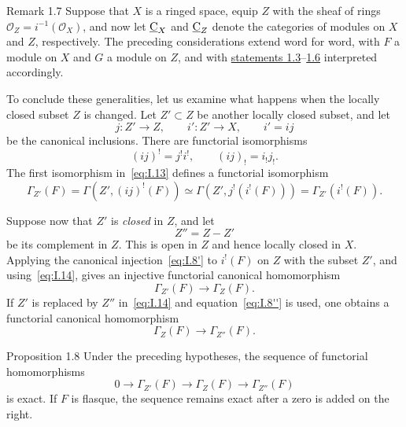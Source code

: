 \begin{sgaremark}{Remark 1.7}
Suppose that $X$ is a ringed space, equip $Z$ with the sheaf of rings
$\mathcal O_Z=i^{-1}(\mathcal O_X)$, and now let $\underline{\mathrm C}_X$ and $\underline{\mathrm C}_Z$
denote the categories of modules on $X$ and $Z$, respectively.  The
preceding considerations extend word for word, with $F$ a module on $X$
and $G$ a module on $Z$, and with \hyperref[I.1.3]{statements 1.3}--\hyperref[I.1.6]{1.6} interpreted
accordingly.
\end{sgaremark}

To conclude these generalities, let us examine what happens when the
locally closed subset $Z$ is changed.  Let $Z'\subset Z$ be another
locally closed subset, and let
\[
  j:Z'\longrightarrow Z,
  \qquad i':Z'\longrightarrow X,
  \qquad i'=ij
\]
be the canonical inclusions.  There are functorial
isomorphisms
\begin{equation}
  (ij)^!=j^!i^!,
  \qquad
  (ij)_!=i_!j_!.
  \tag{13}\label{eq:I.13}
\end{equation}
The first isomorphism in~\eqref{eq:I.13} defines a functorial
isomorphism
\begin{equation}
  \Gamma_{Z'}(F)
  =\Gamma(Z',(ij)^!(F))
  \simeq\Gamma(Z',j^!(i^!(F)))
  =\Gamma_{Z'}(i^!(F)).
  \tag{14}\label{eq:I.14}
\end{equation}

Suppose now that $Z'$ is \emph{closed} in $Z$, and let
\[
  Z''=Z-Z'
\]
be its complement in $Z$.  This is open in $Z$ and hence locally closed
in $X$.  Applying the canonical injection~\eqref{eq:I.8'} to
$i^!(F)$ on $Z$ with the subset $Z'$, and using~\eqref{eq:I.14}, gives
an injective functorial canonical homomorphism
\begin{equation}
  \Gamma_{Z'}(F)\longrightarrow\Gamma_Z(F).
  \tag{15}\label{eq:I.15}
\end{equation}
If $Z'$ is replaced by $Z''$ in~\eqref{eq:I.14} and
equation~\eqref{eq:I.8''} is used, one obtains a functorial
canonical homomorphism
\begin{equation}
  \Gamma_Z(F)\longrightarrow\Gamma_{Z''}(F).
  \tag{$15'$}\label{eq:I.15'}
\end{equation}

\begin{sgastatement}{Proposition 1.8}
Under the preceding hypotheses, the sequence of functorial
homomorphisms
\begin{equation}
  0\longrightarrow\Gamma_{Z'}(F)
  \longrightarrow\Gamma_Z(F)
  \longrightarrow\Gamma_{Z''}(F)
  \tag{16}\label{eq:I.16}
\end{equation}
is exact.  If $F$ is flasque, the sequence remains exact after a zero is
added on the right.
\end{sgastatement}

